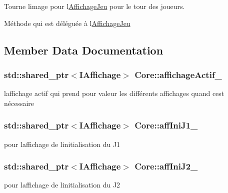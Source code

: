 Tourne l\textquotesingle{}image pour l\textquotesingle{}\hyperlink{class_affichage_jeu}{Affichage\+Jeu} pour le tour des joueurs. 

Méthode qui est déléguée à l\textquotesingle{}\hyperlink{class_affichage_jeu}{Affichage\+Jeu} 

\subsection{Member Data Documentation}
\subsubsection[{\texorpdfstring{affichage\+Actif\+\_\+}{affichageActif_}}]{\setlength{\rightskip}{0pt plus 5cm}std\+::shared\+\_\+ptr$<${\bf I\+Affichage}$>$ Core\+::affichage\+Actif\+\_\+\hspace{0.3cm}{\ttfamily [protected]}}\hypertarget{class_core_ace6812af8ec428d12258d5c895a1fb2d}{}\label{class_core_ace6812af8ec428d12258d5c895a1fb2d}
l\textquotesingle{}affichage actif qui prend pour valeur les différents affichages quand c\textquotesingle{}est nécessaire 
\subsubsection[{\texorpdfstring{aff\+Ini\+J1\+\_\+}{affIniJ1_}}]{\setlength{\rightskip}{0pt plus 5cm}std\+::shared\+\_\+ptr$<${\bf I\+Affichage}$>$ Core\+::aff\+Ini\+J1\+\_\+\hspace{0.3cm}{\ttfamily [protected]}}\hypertarget{class_core_af1b29bd6eb49663e39efff0a91d9c9df}{}\label{class_core_af1b29bd6eb49663e39efff0a91d9c9df}
pour l\textquotesingle{}affichage de l\textquotesingle{}initialisation du J1 
\subsubsection[{\texorpdfstring{aff\+Ini\+J2\+\_\+}{affIniJ2_}}]{\setlength{\rightskip}{0pt plus 5cm}std\+::shared\+\_\+ptr$<${\bf I\+Affichage}$>$ Core\+::aff\+Ini\+J2\+\_\+\hspace{0.3cm}{\ttfamily [protected]}}\hypertarget{class_core_a4d85e8590561c684900e1a2fd18184e2}{}\label{class_core_a4d85e8590561c684900e1a2fd18184e2}
pour l\textquotesingle{}affichage de l\textquotesingle{}initialisation du J2 
